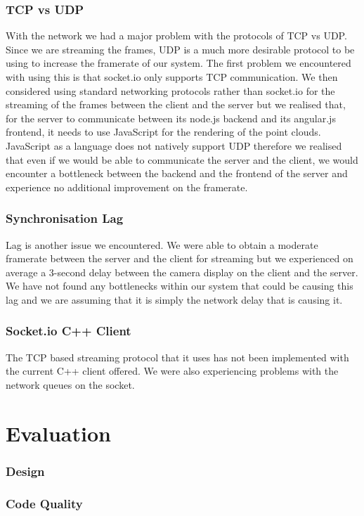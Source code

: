 \documentclass{article}
\begin{document}
\subsubsection{TCP vs UDP}
With the network we had a major problem with the protocols of TCP vs UDP. Since we are streaming the frames, UDP is a much more desirable protocol to be using to increase the framerate of our system. The first problem we encountered with using this is that socket.io only supports TCP communication. We then considered using standard networking protocols rather than socket.io for the streaming of the frames between the client and the server but we realised that, for the server to communicate between its node.js backend and its angular.js frontend, it needs to use JavaScript for the rendering of the point clouds. JavaScript as a language does not natively support UDP therefore we realised that even if we would be able to communicate the server and the client, we would encounter a bottleneck between the backend and the frontend of the server and experience no additional improvement on the framerate.
\subsubsection{Synchronisation Lag}
Lag is another issue we encountered. We were able to obtain a moderate framerate between the server and the client for streaming but we experienced on average a 3-second delay between the camera display on the client and the server. We have not found any bottlenecks within our system that could be causing this lag and we are assuming that it is simply the network delay that is causing it.
\subsubsection{Socket.io C++ Client}
The TCP based streaming protocol that it uses has not been implemented with the current C++ client offered.
We were also experiencing problems with the network queues on the socket.
\newpage
\section{Evaluation}
\subsubsection{Design}
\subsubsection{Code Quality}
\end{document}
